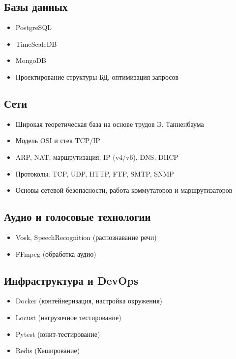 \documentclass[a4paper,12pt]{article}
\begin{document}
	\subsection*{Базы данных}
	\begin{itemize}[leftmargin=1.5em]
		\item PostgreSQL
		\item TimeScaleDB
		\item MongoDB
		\item Проектирование структуры БД, оптимизация запросов
	\end{itemize}
	
	\subsection*{Сети}
	\begin{itemize}
		\item Широкая теоретическая база на основе трудов Э. Танненбаума
		\item Модель OSI и стек TCP/IP
		\item ARP, NAT, маршрутизация, IP (v4/v6), DNS, DHCP
		\item Протоколы: TCP, UDP, HTTP, FTP, SMTP, SNMP
		\item Основы сетевой безопасности, работа коммутаторов и маршрутизаторов
	\end{itemize}
	
	\subsection*{Аудио и голосовые технологии}
	\begin{itemize}[leftmargin=1.5em]
		\item Vosk, SpeechRecognition (распознавание речи)
		\item FFmpeg (обработка аудио)
	\end{itemize}
	
	\subsection*{Инфраструктура и DevOps}
	\begin{itemize}[leftmargin=1.5em]
		\item Docker (контейнеризация, настройка окружения)
		\item Locust (нагрузочное тестирование)
		\item Pytest (юнит-тестирование)
		\item Redis (Кеширование)
	\end{itemize}
	
\end{document}
